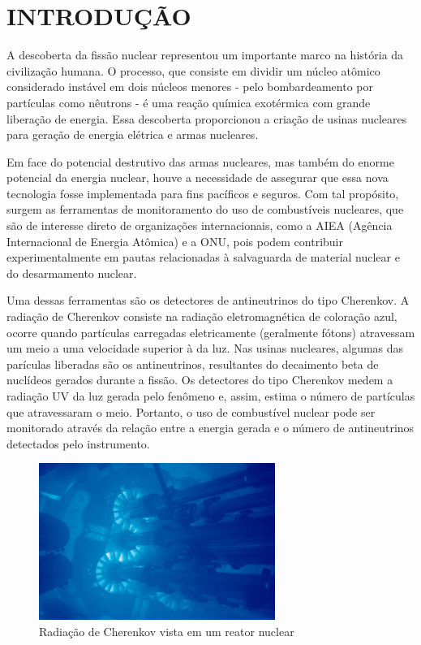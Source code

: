 \chapter{INTRODUÇÃO} \label{cap:intro}
\vspace{-2cm}

A descoberta da fissão nuclear representou um importante marco na história da civilização humana. O processo, que consiste em dividir um núcleo atômico considerado instável em dois núcleos menores - pelo bombardeamento por partículas como nêutrons - é uma reação química exotérmica com grande liberação de energia. Essa descoberta proporcionou a criação de usinas nucleares para geração de energia elétrica e armas nucleares. 

Em face do potencial destrutivo das armas nucleares, mas também do enorme potencial da energia nuclear, houve a necessidade de assegurar que essa nova tecnologia fosse implementada para fins pacíficos e seguros. Com tal propósito, surgem as ferramentas de monitoramento do uso de combustíveis nucleares, que são de interesse direto de organizações internacionais, como a AIEA (Agência Internacional de Energia Atômica) e a ONU, pois podem contribuir experimentalmente em pautas relacionadas à salvaguarda de material nuclear e do desarmamento nuclear.

Uma dessas ferramentas são os detectores de antineutrinos do tipo Cherenkov. A radiação de Cherenkov consiste na radiação eletromagnética de coloração azul, ocorre quando partículas carregadas eletricamente (geralmente fótons) atravessam um meio a uma velocidade superior à da luz\cite{leo2012techniques}. Nas usinas nucleares, algumas das parículas liberadas são os antineutrinos, resultantes do decaimento beta de nuclídeos gerados durante a fissão. Os detectores do tipo Cherenkov medem a radiação UV da luz gerada pelo fenômeno e, assim, estima o número de partículas que atravessaram o meio. Portanto, o uso de combustível nuclear pode ser monitorado através da relação entre a energia gerada e o número de antineutrinos detectados pelo instrumento.


\begin{figure}[H]
	\centering
		\includegraphics[width=7.7cm]{textuais/introducao/figuras/Cherenkov1.jpg}
		\caption{Radiação de Cherenkov vista em um reator nuclear}
		\label{fig:cherenkov}
\end{figure}%

